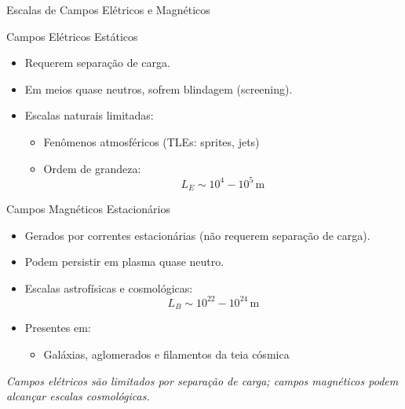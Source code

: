 \documentclass[aspectratio=169]{beamer}
\begin{document}
\begin{frame}{Escalas de Campos Elétricos e Magnéticos}

\begin{block}{Campos Elétricos Estáticos}
\begin{itemize}
    \item Requerem \alert{separação de carga}.
    \item Em meios quase neutros, sofrem \alert{blindagem (screening)}.
    \item Escalas naturais limitadas:
    \begin{itemize}
        \item Fenômenos atmosféricos (TLEs: sprites, jets)
        \item Ordem de grandeza:
        \begin{equation}
        L_E \sim 10^{4} - 10^{5}\,\text{m}
        \end{equation}
    \end{itemize}
\end{itemize}
\end{block}

\vspace{0.1cm}

\begin{block}{Campos Magnéticos Estacionários}
\begin{itemize}
    \item Gerados por \alert{correntes estacionárias} (não requerem separação de carga).
    \item Podem persistir em \alert{plasma quase neutro}.
    \item Escalas astrofísicas e cosmológicas:
    \begin{equation}
    L_B \sim 10^{22} - 10^{24}\,\text{m}
    \end{equation}
    \item Presentes em:
    \begin{itemize}
        \item Galáxias, aglomerados e filamentos da teia cósmica
    \end{itemize}
\end{itemize}
\end{block}

\vspace{0.2cm}

\centering
\textit{\small Campos elétricos são limitados por separação de carga; campos magnéticos podem alcançar escalas cosmológicas.}

\end{frame}
\end{document}
